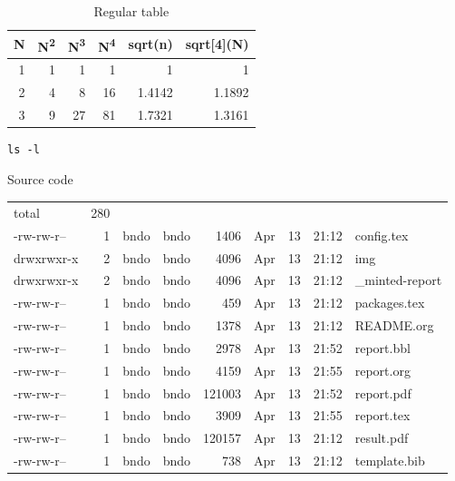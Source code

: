 \documentclass[14pt]{extarticle}
\begin{document}
\begin{table}[htbp]
\caption{\label{tbl:table3}Regular table}
\centering
\begin{tabular}{|r|rrr|rr|}
\hline
N & N\textsuperscript{2} & N\textsuperscript{3} & N\textsuperscript{4} & sqrt(n) & sqrt[4](N)\\
\hline
1 & 1 & 1 & 1 & 1 & 1\\
2 & 4 & 8 & 16 & 1.4142 & 1.1892\\
3 & 9 & 27 & 81 & 1.7321 & 1.3161\\
\hline
\end{tabular}
\end{table}

\begin{listing}[htbp]
\begin{verbatim}
ls -l
\end{verbatim}
\caption{Source code}
\end{listing}

\begin{center}
\begin{tabular}{lrllrlrrl}
total & 280 &  &  &  &  &  &  & \\
-rw-rw-r-- & 1 & bndo & bndo & 1406 & Apr & 13 & 21:12 & config.tex\\
drwxrwxr-x & 2 & bndo & bndo & 4096 & Apr & 13 & 21:12 & img\\
drwxrwxr-x & 2 & bndo & bndo & 4096 & Apr & 13 & 21:12 & \_minted-report\\
-rw-rw-r-- & 1 & bndo & bndo & 459 & Apr & 13 & 21:12 & packages.tex\\
-rw-rw-r-- & 1 & bndo & bndo & 1378 & Apr & 13 & 21:12 & README.org\\
-rw-rw-r-- & 1 & bndo & bndo & 2978 & Apr & 13 & 21:52 & report.bbl\\
-rw-rw-r-- & 1 & bndo & bndo & 4159 & Apr & 13 & 21:55 & report.org\\
-rw-rw-r-- & 1 & bndo & bndo & 121003 & Apr & 13 & 21:52 & report.pdf\\
-rw-rw-r-- & 1 & bndo & bndo & 3909 & Apr & 13 & 21:55 & report.tex\\
-rw-rw-r-- & 1 & bndo & bndo & 120157 & Apr & 13 & 21:12 & result.pdf\\
-rw-rw-r-- & 1 & bndo & bndo & 738 & Apr & 13 & 21:12 & template.bib\\
\end{tabular}
\end{center}
\end{document}
